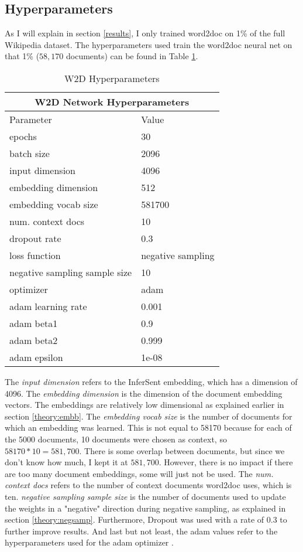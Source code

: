 \subsection{Hyperparameters}
\label{exp:hyppar}

As I will explain in section \ref{results}, I only trained word2doc on 1\% of the full Wikipedia dataset. The hyperparameters used
train the word2doc neural net on that 1\% ($58,170$ documents) can be found in Table \ref{tbl:w2d-hyp}.

\begin{table}[H]
  \centering
  \begin{tabular}{|p{6cm}|p{4cm}|}
    \hline
    \multicolumn{2}{|c|}{W2D Network Hyperparameters} \\
    \hline
    Parameter&Value \\
    \hline
    \hline
    epochs & 30 \\
    batch size &2096 \\
    input dimension & 4096 \\
    embedding dimension & 512 \\
    embedding vocab size & 581700 \\
    num\@. context docs & 10 \\
    dropout rate & 0.3 \\
    loss function & negative sampling \\
    negative sampling sample size & 10 \\
    optimizer & adam \\
    adam learning rate & 0.001 \\
    adam beta1 & 0.9 \\
    adam beta2 & 0.999 \\
    adam epsilon & 1e-08 \\
    \hline
  \end{tabular}
  \caption{W2D Hyperparameters}
  \label{tbl:w2d-hyp}
\end{table}

The \textit{input dimension} refers to the InferSent embedding, which has a dimension of 4096. The \textit{embedding dimension} is
the dimension of the document embedding vectors. The embeddings are relatively low dimensional as explained earlier in section
\ref{theory:embb}. The \textit{embedding vocab size} is the number of documents for which an embedding was learned. This is not
equal to 58170 because for each of the 5000 documents, 10 documents were chosen as context, so $58170 * 10 = 581,700$. There is
some overlap between documents, but since we don't know how much, I kept it at $581,700$. However, there is no impact if there are
too many document
embeddings, some will just not be used. The \textit{num\@. context docs} refers to the number of context documents word2doc uses,
which is ten. \textit{negative sampling sample size} is the number of documents used to update the weights in a "negative" direction
during negative sampling, as explained in section \ref{theory:negsamp}. Furthermore, Dropout \citep{dropout} was used with a rate of
0.3 to further improve results. And last but not least, the adam values refer to the hyperparameters used for the adam optimizer
\citep{adam}.


